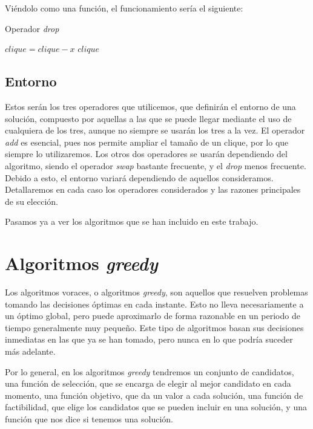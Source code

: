 Viéndolo como una función, el funcionamiento sería el siguiente:

\begin{algorithm}[H]
\caption{Operador \textit{drop}}
  \begin{algorithmic}
    \State $clique = clique - x$
    \Return $clique$
  \EndFunction
  \end{algorithmic}
\end{algorithm}


\subsection{Entorno}

Estos serán los tres operadores que utilicemos, que definirán el entorno de una solución, compuesto por
aquellas a las que se puede llegar mediante el uso de cualquiera de los tres, aunque no siempre se
usarán los tres a la vez. El operador \textit{add} es esencial, pues nos permite ampliar el tamaño de un
clique, por lo que siempre lo utilizaremos. Los otros dos operadores se usarán dependiendo del algoritmo,
siendo el operador \textit{swap} bastante frecuente, y el \textit{drop} menos frecuente. Debido a esto,
el entorno variará dependiendo de aquellos consideramos. Detallaremos en cada caso los operadores
considerados y las razones principales de su elección.

Pasamos ya a ver los algoritmos que se han incluido en este trabajo.

\section{Algoritmos \textit{greedy}}\label{greedy}

Los algoritmos voraces, o algoritmos \textit{greedy}, son aquellos que resuelven problemas tomando
las decisiones óptimas en cada instante. Esto no lleva necesariamente a un óptimo global, pero puede
aproximarlo de forma razonable en un periodo de tiempo generalmente muy pequeño. Este tipo de algoritmos
basan sus decisiones inmediatas en las que ya se han tomado, pero nunca en lo que podría suceder más
adelante.

Por lo general, en los algoritmos \textit{greedy} tendremos un conjunto de candidatos, una función
de selección, que se encarga de elegir al mejor candidato en cada momento, una función objetivo, que
da un valor a cada solución, una función de factibilidad, que elige los candidatos que se pueden incluir
en una solución, y una función que nos dice si tenemos una solución.

